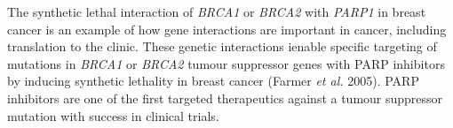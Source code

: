

The synthetic lethal interaction of \textit{BRCA1} or \textit{BRCA2} with \textit{PARP1} in breast cancer is an example of how gene interactions are important in cancer, including translation to the clinic. These genetic interactions ienable specific targeting of mutations in \textit{BRCA1} or \textit{BRCA2} tumour suppressor genes with PARP inhibitors by inducing synthetic lethality in breast cancer (Farmer\textit{ et al.} 2005). PARP inhibitors are one of the first targeted therapeutics against a tumour suppressor mutation with success in clinical trials. 

